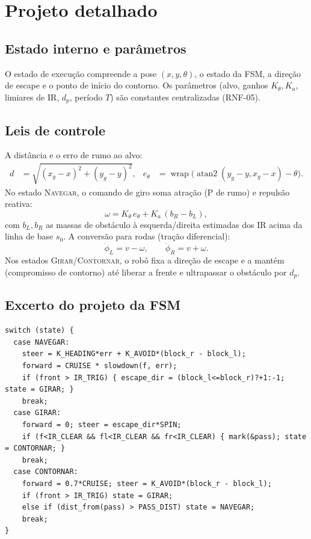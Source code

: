 \section{Projeto detalhado}
\subsection{Estado interno e parâmetros}
O estado de execução compreende a pose $(x,y,\theta)$, o estado da FSM, a direção de escape e o ponto de início do contorno. Os parâmetros (alvo, ganhos $K_\theta,K_a$, limiares de IR, $d_p$, período $T$) são constantes centralizadas (RNF-05).

\subsection{Leis de controle}
A distância e o erro de rumo ao alvo:
\begin{align}
  d &= \sqrt{(x_g-x)^2+(y_g-y)^2}, &
  e_\theta &= \operatorname{wrap}\!\big(\operatorname{atan2}(y_g-y,x_g-x)-\theta\big).
\end{align}
No estado \textsc{Navegar}, o comando de giro soma atração (P de rumo) e repulsão reativa:
\begin{equation}
  \omega = K_\theta\,e_\theta + K_a\,(b_R-b_L),
\end{equation}
com $b_L,b_R$ as massas de obstáculo à esquerda/direita estimadas dos IR acima da linha de base $s_0$. A conversão para rodas (tração diferencial):
\begin{equation}
  \dot\phi_L = v-\omega, \qquad \dot\phi_R = v+\omega.
\end{equation}
Nos estados \textsc{Girar}/\textsc{Contornar}, o robô fixa a direção de escape e a mantém (compromisso de contorno) até liberar a frente e ultrapassar o obstáculo por $d_p$.

\subsection{Excerto do projeto da FSM}
\begin{lstlisting}[style=c,caption={Núcleo da máquina de estados.}]
switch (state) {
  case NAVEGAR:
    steer = K_HEADING*err + K_AVOID*(block_r - block_l);
    forward = CRUISE * slowdown(f, err);
    if (front > IR_TRIG) { escape_dir = (block_l<=block_r)?+1:-1; state = GIRAR; }
    break;
  case GIRAR:
    forward = 0; steer = escape_dir*SPIN;
    if (f<IR_CLEAR && fl<IR_CLEAR && fr<IR_CLEAR) { mark(&pass); state = CONTORNAR; }
    break;
  case CONTORNAR:
    forward = 0.7*CRUISE; steer = K_AVOID*(block_r - block_l);
    if (front > IR_TRIG) state = GIRAR;
    else if (dist_from(pass) > PASS_DIST) state = NAVEGAR;
    break;
}
\end{lstlisting}

